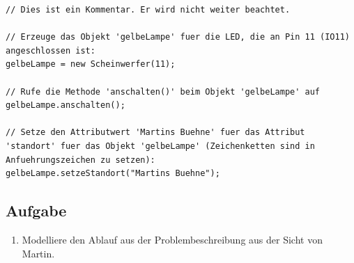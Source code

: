 \documentclass[11pt, a4paper]{article}
\begin{document}
\vspace{0.2cm}
\lstset{language=Java}
\javastyle 
\begin{lstlisting}[caption={Steuerung eines Scheinwerfers.},label={listing:einfache_led}]
// Dies ist ein Kommentar. Er wird nicht weiter beachtet.

// Erzeuge das Objekt 'gelbeLampe' fuer die LED, die an Pin 11 (IO11) angeschlossen ist:
gelbeLampe = new Scheinwerfer(11);

// Rufe die Methode 'anschalten()' beim Objekt 'gelbeLampe' auf
gelbeLampe.anschalten();

// Setze den Attributwert 'Martins Buehne' fuer das Attribut 'standort' fuer das Objekt 'gelbeLampe' (Zeichenketten sind in Anfuehrungszeichen zu setzen):
gelbeLampe.setzeStandort("Martins Buehne");
\end{lstlisting}

%


\vfill
\subsection*{Aufgabe}
\begin{enumerate}
\item Modelliere den Ablauf aus der Problembeschreibung aus der Sicht von Martin.
\end{enumerate}
\end{document}
